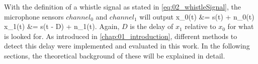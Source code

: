 
With the definition of a whistle signal as stated in \cref{eq:02_whistleSignal},
the microphone sensors $channel_0$ and $channel_1$ will output
\bsub
\label{eq:02_signalTimeDomain}
\bal
    x_0(t) &= s(t) + n_0(t)\\
    x_1(t) &= \alpha s(t - D) + n_1(t).
\eal \esub
Again, $D$ is the delay of $x_1$ relative to $x_0$ for what is looked for.
As introduced in \cref{chap:01_introduction}, different methods to detect this delay
were implemented and evaluated in this work.
In the following sections, the theoretical background of these will be
explained in detail.